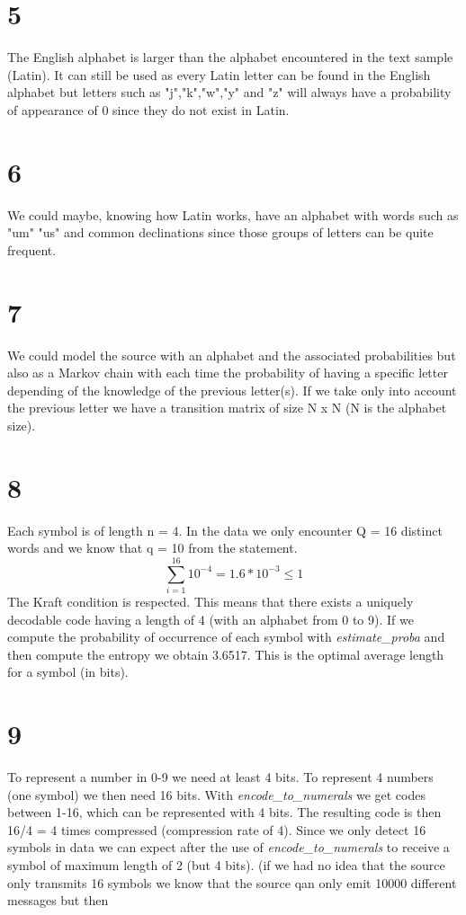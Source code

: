 \documentclass[a4paper,12pt]{article}
\begin{document}
\section*{5}
The English alphabet is larger than the alphabet encountered in the text sample (Latin). It can still be used as every Latin letter can be found in the English alphabet but letters such as "j","k","w","y" and "z" will always have a probability of appearance of 0 since they do not exist in Latin.

\section*{6}
We could maybe, knowing how Latin works, have an alphabet with words such as "um" "us" and common declinations since those groups of letters can be quite frequent.

\section*{7}
We could model the source with an alphabet and the associated probabilities but also as a Markov chain with each time the probability of having a specific letter depending of the knowledge of the previous letter(s). If we take only into account the previous letter we have a transition matrix of size N x N (N is the alphabet size).  
\section*{8}
Each symbol is of length n = 4. In the data we only encounter Q = 16 distinct words and we know that q = 10 from the statement. 
\begin{equation}
\sum_{i=1}^{16} 10^{-4} = 1.6*10^{-3} \leq 1
\end{equation} 
The Kraft condition is respected. This means that there exists a uniquely decodable code having a length of 4 (with an alphabet from 0 to 9).
If we compute the probability of occurrence of each symbol with \textit{estimate\_proba} and then compute the entropy we obtain 3.6517. This is the optimal average length for a symbol (in bits). 

\section*{9}
To represent a number in 0-9 we need at least 4 bits. To represent 4 numbers (one symbol) we then need 16 bits. With \textit{encode\_to\_numerals} we get codes between 1-16, which can be represented with 4 bits. The resulting code is then 16/4 = 4 times compressed (compression rate of 4). Since we only detect 16 symbols in data we can expect after the use of \textit{encode\_to\_numerals} to receive a symbol of maximum length of 2 (but 4 bits). (if we had no idea that the source only transmits 16 symbols we know that the source qan only emit 10000 different messages but then   
\end{document}
